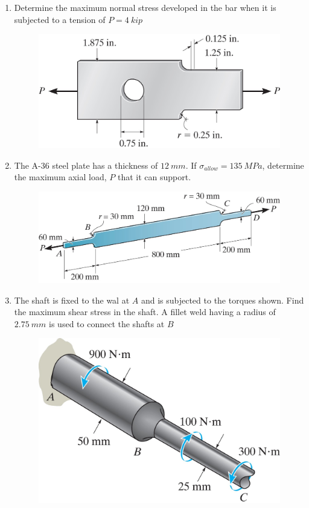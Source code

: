 \documentclass[12pt, oneside]{article}
\let\US\SI
\begin{document}
\begin{enumerate}
	\item %
		Determine the maximum normal stress developed in the bar when it is subjected to a tension of $P = 	\US{4 }{kip} $
		\begin{figure}[H]
			\centering
			\includegraphics[width=0.8\linewidth]{4-92}
		\end{figure}

	\item %
		The A-36 steel plate has a thickness of $ 	\SI{12 }{mm}  $.
		If $\sigma_{allow} = 	\SI{135 }{MPa} $, determine the maximum axial load, $P$ that it can support.
		\begin{figure}[H]
			\centering
			\includegraphics[width=0.6\linewidth]{4-90}
		\end{figure}
		\newpage

	\item %
		The shaft is fixed to the wal at $A$ and is subjected to the torques shown.
		Find the maximum shear stress in the shaft.
		A fillet weld having a radius of $ 	\SI{2.75 }{mm}  $ is used to connect the shafts at $B$
		\begin{figure}[H]
			\centering
			\includegraphics[width=0.6\linewidth]{5-124}
		\end{figure}


\end{enumerate}
\end{document}
